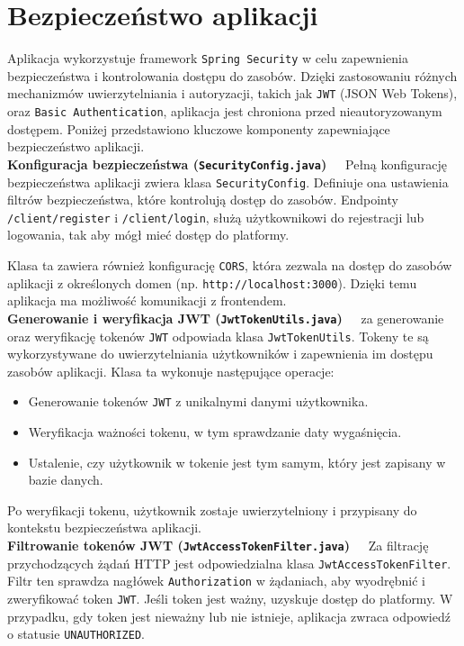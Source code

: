 \section{Bezpieczeństwo aplikacji}
Aplikacja wykorzystuje framework \texttt{Spring Security} w celu zapewnienia bezpieczeństwa i kontrolowania dostępu do zasobów. Dzięki zastosowaniu różnych mechanizmów uwierzytelniania i autoryzacji, takich jak \texttt{JWT} (JSON Web Tokens), oraz \texttt{Basic Authentication}, aplikacja jest chroniona przed nieautoryzowanym dostępem. Poniżej przedstawiono kluczowe komponenty zapewniające bezpieczeństwo aplikacji.\\[-10pt]

\noindent \textbf{Konfiguracja bezpieczeństwa (\texttt{SecurityConfig.java})~~}  
Pełną konfigurację bezpieczeństwa aplikacji zwiera klasa \texttt{SecurityConfig}. Definiuje ona ustawienia filtrów bezpieczeństwa, które kontrolują dostęp do zasobów. Endpointy \texttt{/client/register} i \texttt{/client/login}, służą użytkownikowi do rejestracji lub logowania, tak aby mógł mieć dostęp do platformy. 

Klasa ta zawiera również konfigurację \texttt{CORS}, która zezwala na dostęp do zasobów aplikacji z określonych domen (np. \texttt{http://localhost:3000}). Dzięki temu aplikacja ma możliwość komunikacji z frontendem.\\[-10pt]

\noindent \textbf{Generowanie i weryfikacja JWT (\texttt{JwtTokenUtils.java})~~} 
za generowanie oraz weryfikację tokenów \texttt{JWT} odpowiada klasa \texttt{JwtTokenUtils}. Tokeny te są wykorzystywane do uwierzytelniania użytkowników i zapewnienia im dostępu zasobów aplikacji. Klasa ta wykonuje następujące operacje:
\begin{itemize}
    \item Generowanie tokenów \texttt{JWT} z unikalnymi danymi użytkownika.
    \item Weryfikacja ważności tokenu, w tym sprawdzanie daty wygaśnięcia.
    \item Ustalenie, czy użytkownik w tokenie jest tym samym, który jest zapisany w bazie danych.
\end{itemize}
Po weryfikacji tokenu, użytkownik zostaje uwierzytelniony i przypisany do kontekstu bezpieczeństwa aplikacji.\\[-10pt]

\noindent \textbf{Filtrowanie tokenów JWT (\texttt{JwtAccessTokenFilter.java})~~} 
Za filtrację przychodzących żądań HTTP jest odpowiedzialna klasa \texttt{JwtAccessTokenFilter}. Filtr ten sprawdza nagłówek \texttt{Authorization} w żądaniach, aby wyodrębnić i zweryfikować token \texttt{JWT}. Jeśli token jest ważny, uzyskuje dostęp do platformy. W przypadku, gdy token jest nieważny lub nie istnieje, aplikacja zwraca odpowiedź o statusie \texttt{UNAUTHORIZED}.\\[-10pt]

